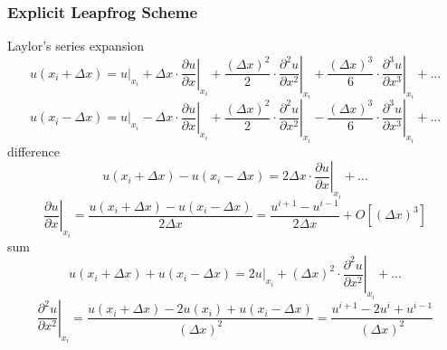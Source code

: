 \subsubsection{Explicit Leapfrog Scheme}
Laylor's series expansion 
\begin{equation}
  u(x_i+\Delta x) = u|_{x_i} + 
  \Delta x\cdot\left.\frac{\partial u}{\partial x}\right|_{x_i} + 
  \frac{(\Delta x)^2}{2}\cdot\left.\frac{\partial ^2 u}{\partial x^2}\right|_{x_i} + 
  \frac{(\Delta x)^3}{6}\cdot\left.\frac{\partial ^3 u}{\partial x^3}\right|_{x_i} + ...
\end{equation}
\begin{equation}
  u(x_i-\Delta x) = u|_{x_i} -
  \Delta x\cdot\left.\frac{\partial u}{\partial x}\right|_{x_i} + 
  \frac{(\Delta x)^2}{2}\cdot\left.\frac{\partial ^2 u}{\partial x^2}\right|_{x_i} -
  \frac{(\Delta x)^3}{6}\cdot\left.\frac{\partial ^3 u}{\partial x^3}\right|_{x_i} + ...
\end{equation}
difference 
\begin{equation}
  u(x_i+\Delta x) - u(x_i-\Delta x) = 2\Delta x\cdot\left.\frac{\partial u}{\partial x}\right|_{x_i}+...
\end{equation}
\begin{equation}
  \left.\frac{\partial u}{\partial x}\right|_{x_i} = \frac{u(x_i+\Delta x) - u(x_i-\Delta x)}{2\Delta x} = \frac{u^{i+1} - u^{i-1}}{2\Delta x} + O[(\Delta x)^3]
\end{equation}
sum 
\begin{equation}
  u(x_i+\Delta x) + u(x_i-\Delta x) = \left.2u\right|_{x_i} + (\Delta x)^2\cdot\left.\frac{\partial ^2 u}{\partial x^2}\right|_{x_i} + ...
\end{equation}
\begin{equation}
  \left.\frac{\partial^2 u}{\partial x^2}\right|_{x_i} = \frac{u(x_i+\Delta x) - 2u(x_i) + u(x_i-\Delta x)}{(\Delta x)^2} = \frac{u^{i+1} - 2u^i + u^{i-1}}{(\Delta x)^2} %
\end{equation}
